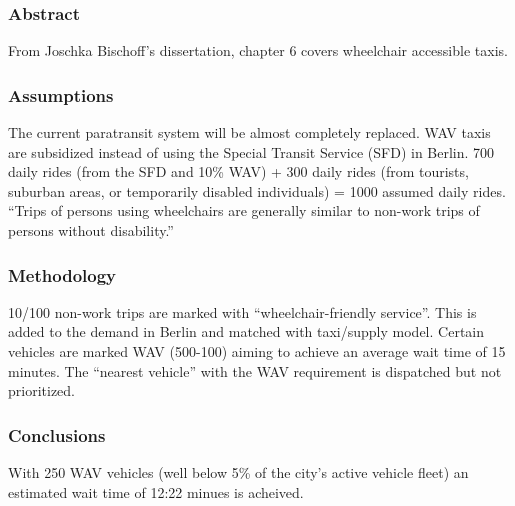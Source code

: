 \documentclass[
]{article}
\begin{document}
\hypertarget{abstract-30}{%
\subsubsection{Abstract}\label{abstract-30}}

From Joschka Bischoff's dissertation, chapter 6 covers wheelchair
accessible taxis.

\hypertarget{assumptions}{%
\subsubsection{Assumptions}\label{assumptions}}

The current paratransit system will be almost completely replaced. WAV
taxis are subsidized instead of using the Special Transit Service (SFD)
in Berlin. 700 daily rides (from the SFD and 10\% WAV) + 300 daily rides
(from tourists, suburban areas, or temporarily disabled individuals) =
1000 assumed daily rides. ``Trips of persons using wheelchairs are
generally similar to non-work trips of persons without disability.''

\hypertarget{methodology}{%
\subsubsection{Methodology}\label{methodology}}

10/100 non-work trips are marked with ``wheelchair-friendly service''.
This is added to the demand in Berlin and matched with taxi/supply
model. Certain vehicles are marked WAV (500-100) aiming to achieve an
average wait time of 15 minutes. The ``nearest vehicle'' with the WAV
requirement is dispatched but not prioritized.

\hypertarget{conclusions}{%
\subsubsection{Conclusions}\label{conclusions}}

With 250 WAV vehicles (well below 5\% of the city's active vehicle
fleet) an estimated wait time of 12:22 minues is acheived.
\end{document}
